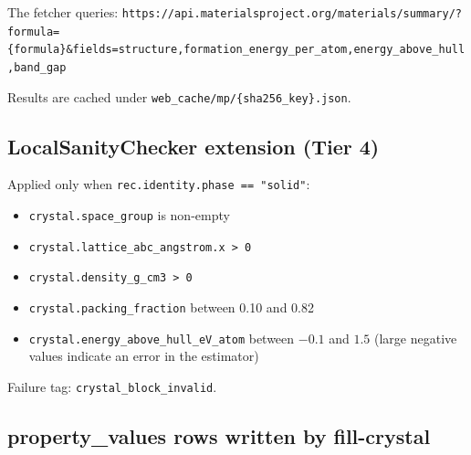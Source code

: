 \documentclass[11pt, a4paper]{article}
\begin{document}
The fetcher queries:
\texttt{https://api.materialsproject.org/materials/summary/?formula=\{formula\}\&fields=structure,formation\_energy\_per\_atom,energy\_above\_hull,band\_gap}

Results are cached under \texttt{web\_cache/mp/\{sha256\_key\}.json}.

\subsection{LocalSanityChecker extension (Tier 4)}

Applied only when \texttt{rec.identity.phase == "solid"}:

\begin{itemize}[leftmargin=*, itemsep=2pt]
  \item \texttt{crystal.space\_group} is non-empty
  \item \texttt{crystal.lattice\_abc\_angstrom.x > 0}
  \item \texttt{crystal.density\_g\_cm3 > 0}
  \item \texttt{crystal.packing\_fraction} between 0.10 and 0.82
  \item \texttt{crystal.energy\_above\_hull\_eV\_atom} between $-0.1$ and $1.5$
		(large negative values indicate an error in the estimator)
\end{itemize}

Failure tag: \texttt{crystal\_block\_invalid}.

\subsection{property\_values rows written by fill-crystal}
\end{document}
